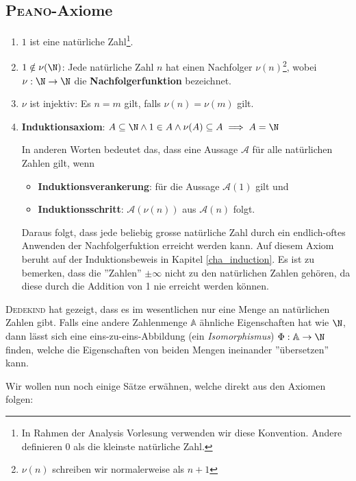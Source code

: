 \subsection{\textsc{Peano}-Axiome}\label{cha_peano_axioms}
\begin{enumerate}
    \item $1$ ist eine natürliche Zahl\footnote{In Rahmen der Analysis Vorlesung verwenden wir diese Konvention. Andere definieren 0 als die kleinste natürliche Zahl.}.
    \item  $1 \notin \nu(\N)$: Jede natürliche Zahl $n$ hat einen Nachfolger $\nu(n)$\footnote{$\nu(n)$ schreiben wir normalerweise als $n + 1$}, wobei $\nu: \N \to \N$ die \textbf{Nachfolgerfunktion} bezeichnet.
    \item $\nu$ ist injektiv: Es $n = m$ gilt, falls $\nu(n) = \nu(m)$ gilt.
    \item \textbf{Induktionsaxiom}: $A \subseteq \N \land 1 \in A \land \nu(A) \subseteq A \implies A = \N$
    
    In anderen Worten bedeutet das, dass eine Aussage $\mathcal{A}$ für alle natürlichen Zahlen gilt, wenn
    \begin{itemize}
        \item \textbf{Induktionsverankerung}: für die Aussage $\mathcal{A}(1)$ gilt und
        \item \textbf{Induktionsschritt}: $\mathcal{A}(\nu(n))$ aus $\mathcal{A}(n)$ folgt.
    \end{itemize} 
    Daraus folgt, dass jede beliebig grosse natürliche Zahl durch ein endlich-oftes Anwenden der Nachfolgerfuktion erreicht werden kann. Auf diesem Axiom beruht auf der Induktionsbeweis in Kapitel \ref{cha_induction}. Es ist zu bemerken, dass die ''Zahlen'' $\pm \infty$ nicht zu den natürlichen Zahlen gehören, da diese durch die Addition von 1 nie erreicht werden können.
\end{enumerate}
\begin{remark}
\textsc{Dedekind} hat gezeigt, dass es im wesentlichen nur eine Menge an natürlichen Zahlen gibt. Falls eine andere Zahlenmenge $\mathbb{A}$ ähnliche Eigenschaften hat wie $\N$, dann lässt sich eine eins-zu-eins-Abbildung (ein \textit{Isomorphismus}) $\Phi: \mathbb{A} \to \N$ finden, welche die Eigenschaften von beiden Mengen ineinander ''übersetzen'' kann.
\end{remark}

Wir wollen nun noch einige Sätze erwähnen, welche direkt aus den Axiomen folgen:

